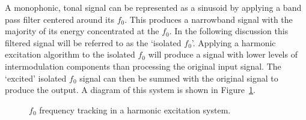 		A monophonic, tonal signal can be represented as a sinusoid by applying a band pass filter centered around
		its $f_{0}$. This produces a narrowband signal with the majority of its energy concentrated at the $f_{0}$.
		In the following discussion this filtered signal will be referred to as the `isolated $f_{0}$'. Applying a
		harmonic excitation algorithm to the isolated $f_{0}$ will produce a signal with lower levels of
		intermodulation components than processing the original input signal. The `excited' isolated $f_{0}$ signal
		can then be summed with the original signal to produce the output. A diagram of this system is shown in
		Figure~\ref{fig:F0Tracking}.

		\begin{figure}[h!]
			\centering
			\caption{$f_{0}$ frequency tracking in a harmonic excitation system.}
			\label{fig:F0Tracking}
		\end{figure}

